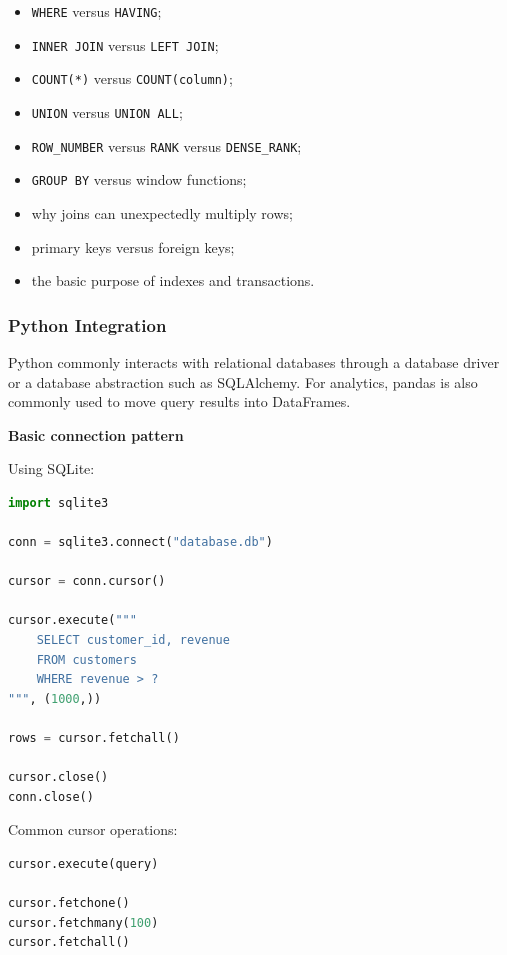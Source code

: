 \documentclass[11pt,letterpaper]{article}
\begin{document}
\begin{itemize}[leftmargin=*]
    \item \texttt{WHERE} versus \texttt{HAVING};
    \item \texttt{INNER JOIN} versus \texttt{LEFT JOIN};
    \item \texttt{COUNT(*)} versus \texttt{COUNT(column)};
    \item \texttt{UNION} versus \texttt{UNION ALL};
    \item \texttt{ROW\_NUMBER} versus \texttt{RANK} versus \texttt{DENSE\_RANK};
    \item \texttt{GROUP BY} versus window functions;
    \item why joins can unexpectedly multiply rows;
    \item primary keys versus foreign keys;
    \item the basic purpose of indexes and transactions.
\end{itemize}



\subsubsection{Python Integration}

Python commonly interacts with relational databases through a database driver
or a database abstraction such as SQLAlchemy. For analytics, pandas is also
commonly used to move query results into DataFrames.

\textbf{Basic connection pattern}

Using SQLite:

\begin{lstlisting}[language=Python]
import sqlite3

conn = sqlite3.connect("database.db")

cursor = conn.cursor()

cursor.execute("""
    SELECT customer_id, revenue
    FROM customers
    WHERE revenue > ?
""", (1000,))

rows = cursor.fetchall()

cursor.close()
conn.close()
\end{lstlisting}

Common cursor operations:

\begin{lstlisting}[language=Python]
cursor.execute(query)

cursor.fetchone()
cursor.fetchmany(100)
cursor.fetchall()
\end{lstlisting}
\end{document}
